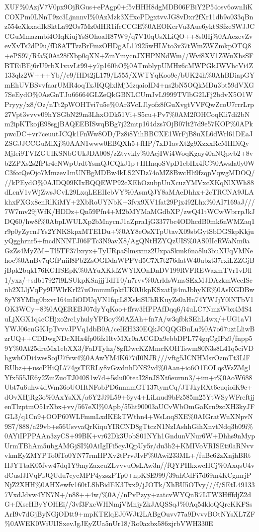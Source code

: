 \documentclass[]{article}
\begin{document}
XUF\%0AzjV7V0px9OjRGus+ePAgp0+f5vHHH8dgMDB06FBiY2P54osv6ownIiKCOXPm0LNnT9zc3LjnnnvI\%0AzMzk3XffxcPDgxtvvJG8vDxr2fXr11db9o033qBnz554eXkxadIkSktLa92Os7Mz0dHR1ifcCCGE\%0AEOKcrVu3Aue6yktSSfzeSWJJCCGuMmazmbi4OIqKiujYsSOhoaH87W9/q7V10qUsXLiQO++8s0Hj\%0AAezevZvevXvTs2dP9u/fD8ATTzzBrFmzOHDgAL17925wHLVto3v37tWmZWZmkpOTQ8+ePS97/Rfa\%0At28fXbp0qXN+ZmYmycnJXHPNNdWm//Wvf8XV1ZWuXbsSFBTEiBEj6rU9rbX1vavLt99+y7p160hO\%0ATmblypUMHz6cMWPGkJWVhcVi4Z133qlz2W+++Yb//e9/HDt2jL179/L555/XWTYqKoo9e/bUK24h\%0AhBDiapGYmEhUVBSvvfaarUMR4oqTxJIQQlxlMjMzqaioID4+ns2bN5OQkMDu3bt59dVXG7SeEydO\%0AsGnTJu66664GLZeQkGBNLCUmJvL9999TVlbG2LFj2bdvX5O1WPryyy/x8/Oz/nTt2pWOHTvi7u5e\%0Ar3VcLJlyofz8fGuXvgtVVFQwZcoU7rrrLrp27Vpt3vvvv09hYSGbN29m3LhxODk51Vi+S5cu+Pv7\%0AM2fOHCoqKli7di2bNm2ipKTkojE98sgjBAQEEBISwqBBg7j22mtp164dzs7OjB07lt27d9e57KOP\%0APkpwcDC+vr7ceuutJCQk1FnWw8OD/Pz8i8YihBBCXE1WrFjB8uXL6dWrl61DEaJZSGJJCCGuMlXj\%0AAN1www0EBQXh5+fHP/7xD1avXt2g9XzxxRcMHDiQyMjIei9TVlZGUlKSNbGUkJDA008/zZtvvkly\%0AcjIWi4WoqKgay40aNQpvb2+8vb2ZPXs2s2fPtr4eNWpUrdtYsmQJCQkJ1p+HHnqoSVpD1cbHx4fC\%0AwsIa0y0WC3fccQeOjo7Mmzev1mUNBgMDBw4kLS2NDz74oMZ8BwcHli9fzqpVqwgMDOQ///kPEydO\%0AJDQ09KIxBQQEWP92cXEhOzubpUuXcuzYMVxcXKqNlXWh88dLcnV1vWjZwsJCvL29LxqLEEIIcbVY\%0AsmQJY8aMAeDhhx+2cTRCNA9JLAkhxFXGx8enRlKiMY+2XbRoUYNbK+3fvx9XV1fat29Pjx492Lhx\%0AI7169aJ///7W7mv29jWfK/HDDz+Qn59Pfn4+M2bMYMaMGdbXP/zwQ41tWCwWbrrpJkJDQ60/hw8f\%0AbpLWULXp2bMnycnJ1aZpra1jG3377bc4ODhcdB0mk6nWMZaq1r9p0yZycnJYs2YNKSkpxMTE1Du+\%0AY8eOsXTpUtavX09sbGytSbDGSkpKkjuyQgghrnr5+fncdNNNTJ06FTc3N9avX8/AgQNtHZYQzUIS\%0AS0IIcRWaNm0aGzZs4MyZM+Tl5TF37lxryx+TyURpaSlmsxmz2UxpaSkmk6na8lu3buXUqVMNehoc\%0AnBv7qGfPniil8Pb2ZsOGDdaWPFVd5C7X7t276datW40ubzt37rxiLZZGjBjBpk2bqk176KGHSEpK\%0AYuXKldZWYlXOnDnDV199RVFREWazmTVr1vDll1/yxz/+sdb17927l9LSUkpKSnjjjTdIT0/n7rvv\%0ArldsWmsSExMJDAzkmWeeIScnh2XLljVqPy9UWlrKrl27uOmmm5pkfUK0JikpKSxatIji4mJbhyKE\%0AsKGDBw8yY8YMhg0bxvr164mIiODUqVN1fqcL8XskiSUhRKuyZs0aHn74YWJjY0lNTbV1OK3WCy+8\%0AQEREBJ07dyYqKoo+ffrw3HPPAfDqq6/i4uLC7NmzWbx4MS4uLjXGX1q4cCHjxo2rc1yhulyYPBoy\%0AZAh+fn7A/w3qfbkSEhL4wx/+UG1aVlYWJ06cuGKJpTvvvJPVq1dbB0A/ceIEH330EQkJCQQGBuLu\%0A7o67uztLliwBzrUQ++CDDwgNDcXHx4fp06fz1ltvMXr0aACGDx9ebbDPL774gqCgIPz9/fnpp59Y\%0At25dreMx1ebXX3/FaDTyhz/8gfDwcKZMmcKOHTswm80N3s8L41q5ciVDhgwhODi4wesSojU7fvw4\%0AAwYM4K677iI0NJR///vftg5JCNHMsrOzmTt3LlFRUbz++uscPHiQL774gsTERLy8vGwdnhDNS2vd\%0Aan+io6O1EOLqsWzZMg1Yfx555JE6y2ZmZuoTJ040S1w7d+5slu00teaI28nJSXt6eurnn3/+im+r\%0AoW688Ubt7u6uhw4dWm36oUOHtNFobPD6nnnmGT137tymCq/JTJkyRXt6euqioiK9c+dOvXHjRg3o\%0AxYsXX/a6Y2Ji9L59+6yv4+LiLnud9bFz585m25YtWSyWFreftjjenTlzptmO51rXbx+vv/567eXl\%0Apb/55ht90003aUCvWbOmGaKrn9zcXH3kyJFGL3/q1Cn9+OOP60WLFmmLxdKEkTWthn4+WsLnqSXE\%0AIGratWuXNpvN9S7/888/a29vb+s56UsvvaQrKiquYIRCND8gTtczN1NzIAshhGihXnvtNdq3b09i\%0AYiIPPPAAn3zyCS+99BK+vr62Dk3UobS01NYh1GndunVNur6W+Dhhs9nMypUrmTBhAm5ubgAMGjSI\%0AiIgIFi5cyJQpUy5r/du3b2+KMIVoVRISEti0aRNvvvkmEyZMYPTo0fTo0YN77rmHPXv2tPrvJIvF\%0Awi233ML+/fuBc62zXnjhBRtHJYTtaK05fvw47dq1Y9myZaxcuZLvvvuOsLAw3n//fQYPHkxwcHCj\%0AxqsU4vdCusIJIVqFlJQUdu7cycMPP4yzszPTp0+npKSE999/39ahCdFi7d69m4KCgmrjPNjZ2XHH\%0AHXewfv160tLSbBidEK3Txx9/jJOTk/XhBU5OTvy///f/SEtL491337VxdJdvw4YN7N+/n88++4w/\%0A//nPvPzyy+zatcvWYQnR7LTW3HfffdjZ2dG+fXscHByYOHEi//3vf3FxcWHNmjVMnjyZkJAQSSqJ\%0Aq54kloQQrcKKFSsArI9v7dGjByNGjODtt9+mpKTElqEJ0WJt2LABgOuvv77a9DvvvBOtNYsXL7ZF\%0AWEK0WiUlJSxevJgJEyZUa5nUr18/Ro0axbx586xjrbVWH330E
\end{document}
